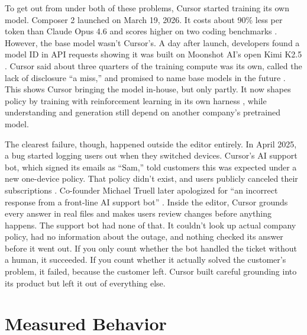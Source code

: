 \documentclass[11pt]{article}
\begin{document}
To get out from under both of these problems, Cursor started training its own model. Composer 2 launched on March 19, 2026. It costs about 90\% less per token than Claude Opus 4.6 and scores higher on two coding benchmarks \citep{datacamp2026composer2}. However, the base model wasn't Cursor's. A day after launch, developers found a model ID in API requests showing it was built on Moonshot AI's open Kimi K2.5 \citep{datacamp2026composer2}. Cursor said about three quarters of the training compute was its own, called the lack of disclosure ``a miss,'' and promised to name base models in the future \citep{datacamp2026composer2}. This shows Cursor bringing the model in-house, but only partly. It now shapes policy by training with reinforcement learning in its own harness \citep{cursor2025composer}, while understanding and generation still depend on another company's pretrained model.

The clearest failure, though, happened outside the editor entirely. In April 2025, a bug started logging users out when they switched devices. Cursor's AI support bot, which signed its emails as ``Sam,'' told customers this was expected under a new one-device policy. That policy didn't exist, and users publicly canceled their subscriptions \citep{fortune2025sam}. Co-founder Michael Truell later apologized for ``an incorrect response from a front-line AI support bot'' \citep{fortune2025sam}. Inside the editor, Cursor grounds every answer in real files and makes users review changes before anything happens. The support bot had none of that. It couldn't look up actual company policy, had no information about the outage, and nothing checked its answer before it went out. If you only count whether the bot handled the ticket without a human, it succeeded. If you count whether it actually solved the customer's problem, it failed, because the customer left. Cursor built careful grounding into its product but left it out of everything else.

\section{Measured Behavior}
\end{document}
